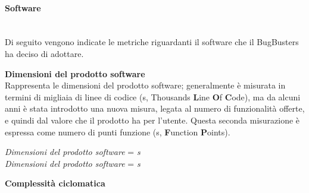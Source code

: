 \paragraph*{Software}\mbox{}\\
Di seguito vengono indicate le metriche riguardanti il software che il  BugBusters ha deciso di adottare.

\textbf{Dimensioni del prodotto software}\\

Rappresenta le dimensioni del prodotto software; generalmente \`e misurata in termini di migliaia di linee di codice (s, Thousands \textbf{L}ine \textbf{O}f \textbf{C}ode), ma da alcuni anni è stata introdotto una nuova misura, legata al numero di funzionalità offerte, e quindi dal valore che il prodotto ha per l'utente. Questa seconda misurazione è espressa come numero di punti funzione (s, \textbf{F}unction \textbf{P}oints). \\
\begin{center}
	\textit{Dimensioni del prodotto software} = \textit{s} \\
	\textit{Dimensioni del prodotto software} = \textit{s} 
\end{center}

\textbf{Complessità ciclomatica}\\

